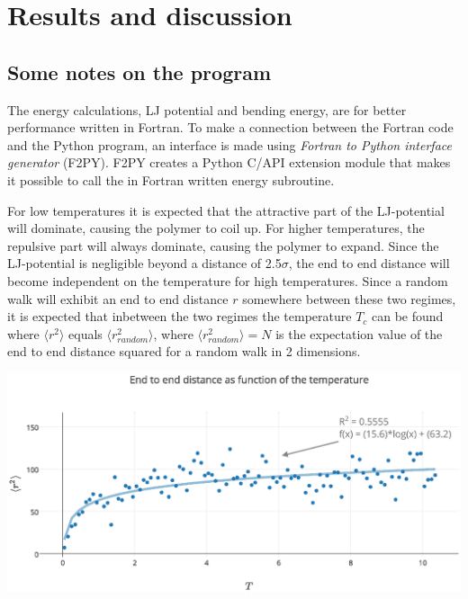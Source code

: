 \section{Results and discussion}

\subsection{Some notes on the program}
The energy calculations, LJ potential and bending energy, are for better performance written in Fortran. To make a connection between the Fortran code and the Python program, an interface is made using \emph{Fortran to Python interface generator} (F2PY). F2PY creates a Python C/API extension module that makes it possible to call the in Fortran written energy subroutine.

For low temperatures it is expected that the attractive part of the LJ-potential will dominate, causing the polymer to coil up. For higher temperatures, the repulsive part will always dominate, causing the polymer to expand. Since the LJ-potential is negligible beyond a distance of 2.5$\sigma$, the end to end distance will become independent on the temperature for high temperatures. Since a random walk will exhibit an end to end distance $r$ somewhere between these two regimes, it is expected that inbetween the two regimes the temperature $T_c$ can be found where $\langle r^2 \rangle$ equals $\langle r_{random}^2 \rangle$, where $\langle r_{random}^2 \rangle = N$ is the expectation value of the end to end distance squared for a random walk in 2 dimensions.
\begin{Figure}
  \centerfloat
     \includegraphics[scale=0.4]{end_to_end_distance_as_function_of_the_temperature.eps}
 \label{fig:end_to_end_afo_temperature}
\end{Figure}